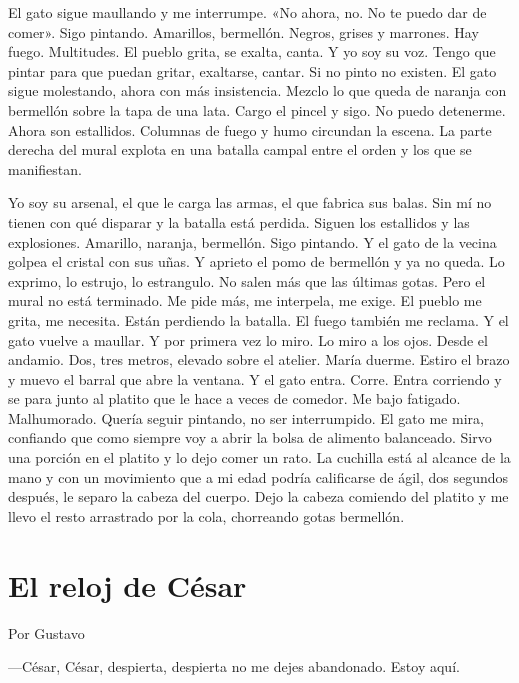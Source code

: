 \documentclass[11pt,twoside,openright,a5paper]{book}
\begin{document}
El gato sigue maullando y me interrumpe. «No ahora, no. No te puedo dar de comer». Sigo pintando. Amarillos, bermellón. Negros, grises y marrones. Hay fuego. Multitudes. El pueblo grita, se exalta, canta. Y yo soy su voz. Tengo que pintar para que puedan gritar, exaltarse, cantar. Si no pinto no existen. El gato sigue molestando, ahora con más insistencia. Mezclo lo que queda de naranja con bermellón sobre la tapa de una lata. Cargo el pincel y sigo. No puedo detenerme. Ahora son estallidos. Columnas de fuego y humo circundan la escena. La parte derecha del mural explota en una batalla campal entre el orden y los que se manifiestan. 

Yo soy su arsenal, el que le carga las armas, el que fabrica sus balas. Sin mí no tienen con qué disparar y la batalla está perdida. Siguen los estallidos y las explosiones. Amarillo, naranja, bermellón. Sigo pintando. Y el gato de la vecina golpea el cristal con sus uñas. Y aprieto el pomo de bermellón y ya no queda. Lo exprimo, lo estrujo, lo estrangulo. No salen más que las últimas gotas. Pero el mural no está terminado. Me pide más, me interpela, me exige. El pueblo me grita, me necesita. Están perdiendo la batalla. El fuego también me reclama. Y el gato vuelve a maullar. Y por primera vez lo miro. Lo miro a los ojos. Desde el andamio. Dos, tres metros, elevado sobre el atelier. María duerme. Estiro el brazo y muevo el barral que abre la ventana. Y el gato entra. Corre. Entra corriendo y se para junto al platito que le hace a veces de comedor. Me bajo fatigado. Malhumorado. Quería seguir pintando, no ser interrumpido. El gato me mira, confiando que como siempre voy a abrir la bolsa de alimento balanceado. Sirvo una porción en el platito y lo dejo comer un rato. La cuchilla está al alcance de la mano y con un movimiento que a mi edad podría calificarse de ágil, dos segundos después, le separo la cabeza del cuerpo. Dejo la cabeza comiendo del platito y me llevo el resto arrastrado por la cola, chorreando gotas bermellón.

\section*{El reloj de César}

\begin{flushright}Por Gustavo\end{flushright}

---César, César, despierta, despierta no me dejes abandonado. Estoy aquí.
\end{document}
